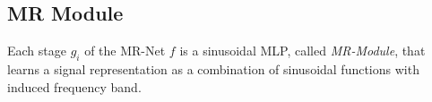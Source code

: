 











\subsection{MR Module}
\label{s-mr-module}
Each stage $g_i$ of the MR-Net $f$ is a sinusoidal MLP, called \textit{MR-Module}, that learns a signal representation as a combination of sinusoidal functions with induced frequency band.

